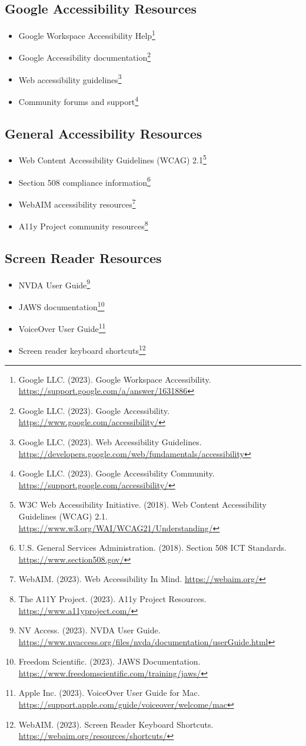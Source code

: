 \subsection{Google Accessibility Resources}
\begin{itemize}
\item Google Workspace Accessibility Help\footnote{Google LLC. (2023). Google Workspace Accessibility. \url{https://support.google.com/a/answer/1631886}}
\item Google Accessibility documentation\footnote{Google LLC. (2023). Google Accessibility. \url{https://www.google.com/accessibility/}}
\item Web accessibility guidelines\footnote{Google LLC. (2023). Web Accessibility Guidelines. \url{https://developers.google.com/web/fundamentals/accessibility}}
\item Community forums and support\footnote{Google LLC. (2023). Google Accessibility Community. \url{https://support.google.com/accessibility/}}
\end{itemize}

\subsection{General Accessibility Resources}
\begin{itemize}
\item Web Content Accessibility Guidelines (WCAG) 2.1\footnote{W3C Web Accessibility Initiative. (2018). Web Content Accessibility Guidelines (WCAG) 2.1. \url{https://www.w3.org/WAI/WCAG21/Understanding/}}
\item Section 508 compliance information\footnote{U.S. General Services Administration. (2018). Section 508 ICT Standards. \url{https://www.section508.gov/}}
\item WebAIM accessibility resources\footnote{WebAIM. (2023). Web Accessibility In Mind. \url{https://webaim.org/}}
\item A11y Project community resources\footnote{The A11Y Project. (2023). A11y Project Resources. \url{https://www.a11yproject.com/}}
\end{itemize}

\subsection{Screen Reader Resources}
\begin{itemize}
\item NVDA User Guide\footnote{NV Access. (2023). NVDA User Guide. \url{https://www.nvaccess.org/files/nvda/documentation/userGuide.html}}
\item JAWS documentation\footnote{Freedom Scientific. (2023). JAWS Documentation. \url{https://www.freedomscientific.com/training/jaws/}}
\item VoiceOver User Guide\footnote{Apple Inc. (2023). VoiceOver User Guide for Mac. \url{https://support.apple.com/guide/voiceover/welcome/mac}}
\item Screen reader keyboard shortcuts\footnote{WebAIM. (2023). Screen Reader Keyboard Shortcuts. \url{https://webaim.org/resources/shortcuts/}}
\end{itemize}

